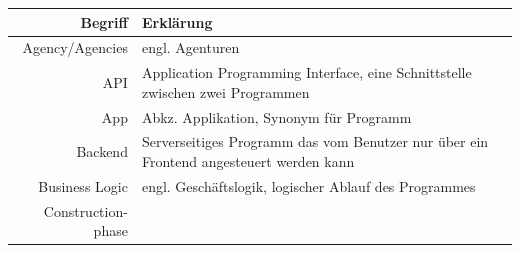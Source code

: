 \documentclass[ngerman,]{article}
\begin{document}
\begin{longtable}[]{@{}rl@{}}
\toprule
\begin{minipage}[b]{0.18\columnwidth}\raggedleft\strut
\textbf{Begriff}\strut
\end{minipage} & \begin{minipage}[b]{0.76\columnwidth}\raggedright\strut
\textbf{Erklärung}\strut
\end{minipage}\tabularnewline
\midrule
\endhead
\begin{minipage}[t]{0.18\columnwidth}\raggedleft\strut
Agency/Agencies\strut
\end{minipage} & \begin{minipage}[t]{0.76\columnwidth}\raggedright\strut
engl. Agenturen\strut
\end{minipage}\tabularnewline
\begin{minipage}[t]{0.18\columnwidth}\raggedleft\strut
API\strut
\end{minipage} & \begin{minipage}[t]{0.76\columnwidth}\raggedright\strut
Application Programming Interface, eine Schnittstelle zwischen zwei
Programmen\strut
\end{minipage}\tabularnewline
\begin{minipage}[t]{0.18\columnwidth}\raggedleft\strut
App\strut
\end{minipage} & \begin{minipage}[t]{0.76\columnwidth}\raggedright\strut
Abkz. Applikation, Synonym für Programm\strut
\end{minipage}\tabularnewline
\begin{minipage}[t]{0.18\columnwidth}\raggedleft\strut
Backend\strut
\end{minipage} & \begin{minipage}[t]{0.76\columnwidth}\raggedright\strut
Serverseitiges Programm das vom Benutzer nur über ein Frontend
angesteuert werden kann\strut
\end{minipage}\tabularnewline
\begin{minipage}[t]{0.18\columnwidth}\raggedleft\strut
Business Logic\strut
\end{minipage} & \begin{minipage}[t]{0.76\columnwidth}\raggedright\strut
engl. Geschäftslogik, logischer Ablauf des Programmes\strut
\end{minipage}\tabularnewline
\begin{minipage}[t]{0.18\columnwidth}\raggedleft\strut
Construction-phase\strut
\end{minipage} & \begin{minipage}[t]{0.76\columnwidth}\raggedright\strut

\end{minipage}
\end{longtable}
\end{document}
